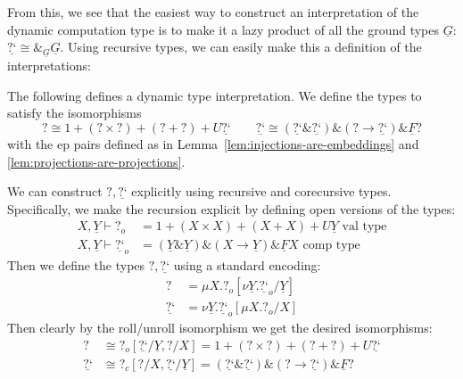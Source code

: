\documentclass[acmsmall,screen,12pt]{acmart}
\renewcommand{\u}{\underline}
\newcommand{\vtype}{\,\,\text{val type}}
\newcommand{\ctype}{\,\,\text{comp type}}
\newcommand{\dynv}{{?}}
\newcommand{\dync}{\u {\text{?`}}}
\newcommand{\with}{\mathbin{\&}}
\DeclareMathOperator*{\With}{\&}
\begin{document}
From this, we see that the easiest way to construct an interpretation
of the dynamic computation type is to make it a lazy product of all
the ground types $\u G$: $\dync \cong \With_{\u G} \u G$.
%
Using recursive types, we can easily make this a definition of the
interpretations:

\begin{definition}
  \label{def:natural-type-interp}
  The following defines a dynamic type interpretation.
  We define the types to satisfy the isomorphisms
  \[
    \dynv \cong 1 + (\dynv \times \dynv) + (\dynv + \dynv) + U\dync \qquad
    \dync \cong (\dync \with \dync) \with (\dynv \to \dync) \with \u F \dynv
  \]
  with the ep pairs defined as in
  Lemma~\ref{lem:injections-are-embeddings} and
  \ref{lem:projections-are-projections}.  
\end{definition}
\begin{longproof}
  We can construct $\dynv, \dync$ explicitly using recursive and
  corecursive types. Specifically, we make the recursion explicit by
  defining open versions of the types:
  \begin{align*}
    X,\u Y \vdash \dynv_o &= 1 + (X \times X) + (X + X) + U\u Y\vtype \\
    X,\u Y \vdash \dync_o &= (\u Y \with \u Y) \with (X \to \u Y) \with \u F X \ctype
  \end{align*}
  Then we define the types $\dynv, \dync$ using a standard encoding:
  \begin{align*}
    \dynv &= \mu X. \dynv_o[\nu \u Y. \dync_o/\u Y]\\
    \dync &= \nu \u Y. \dync_o[\mu X. \dynv_o/X]
  \end{align*}
  Then clearly by the roll/unroll isomorphism we get the desired
  isomorphisms:
  \begin{align*}
    \dynv &\cong \dynv_o[\dync/\u Y,\dynv/X] = 1 + (\dynv \times \dynv) + (\dynv + \dynv) + U\dync \\
    \dync &\cong\dynv_c[\dynv/X,\dync/\u Y] = (\dync \with \dync) \with (\dynv \to \dync) \with \u F \dynv
  \end{align*}
\end{longproof}
\end{document}
